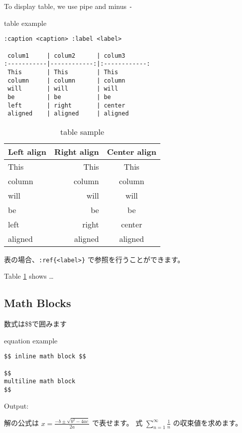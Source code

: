 \documentclass[a4j, titlepage]{jarticle}
\begin{document}
To display table, we use pipe {\tt \textbar{}} and minus {\tt -}

\begin{itembox}[c]{table example}
\begin{verbatim}
:caption <caption> :label <label>

 colum1     | colum2      | colum3
:-----------|------------:|:------------:
 This       | This        | This         
 column     | column      | column       
 will       | will        | will         
 be         | be          | be           
 left       | right       | center       
 aligned    | aligned     | aligned   
\end{verbatim}
\end{itembox}

\begin{table}[h]
\centering
\caption{table sample }
\label{table:1}
\begin{tabular}{|l|r|c|}
\hline
Left align & Right align & Center align\\
\hline
This & This & This\\
column & column & column\\
will & will & will\\
be & be & be\\
left & right & center\\
aligned & aligned & aligned\\
\hline
\end{tabular}
\end{table}

表の場合、{\tt :}{\tt ref\{\textless{}label\textgreater{}\}} で参照を行うことができます。

Table \ref{table:1} shows \ldots{}

\subsection{Math Blocks}

数式は\$\$で囲みます

\begin{itembox}[c]{equation example}
\begin{verbatim}
$$ inline math block $$

$$
multiline math block
$$
\end{verbatim}
\end{itembox}

Output:

解の公式は $ x = \frac{-b\pm\sqrt{b^2-4ac}}{2a} $ で表せます。
式 $ \sum_{n = 1}^{\infty} \frac{1}{n} $ の収束値を求めます。
\end{document}
